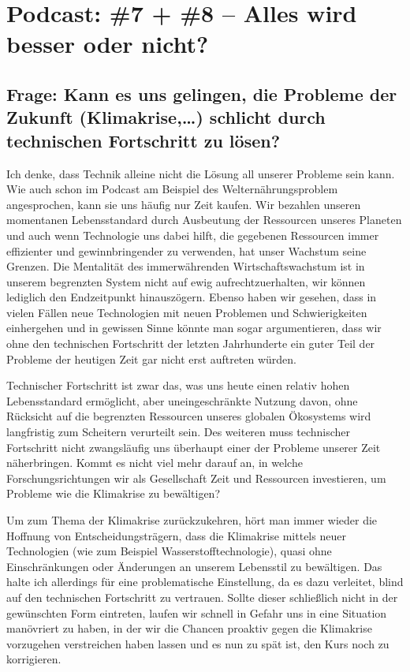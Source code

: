 \documentclass[twoside, a4paper, DIV=11, open=any, bibliography=totoc]{scrbook}
\begin{document}
\section{Podcast: \#7 + \#8 -- Alles wird besser oder nicht?}

\subsection{Frage: Kann es uns gelingen, die Probleme der Zukunft (Klimakrise,\dots)
schlicht durch technischen Fortschritt zu lösen?}

Ich denke, dass Technik alleine nicht die Lösung all unserer Probleme sein kann.
Wie auch schon im Podcast am Beispiel des Welternährungsproblem angesprochen,
kann sie uns häufig nur Zeit kaufen. Wir bezahlen unseren momentanen Lebensstandard
durch Ausbeutung der Ressourcen unseres Planeten und auch wenn Technologie uns dabei
hilft, die gegebenen Ressourcen immer effizienter und gewinnbringender zu verwenden,
hat unser Wachstum seine Grenzen.
Die Mentalität des immerwährenden Wirtschaftswachstum
ist in unserem begrenzten System nicht auf ewig aufrechtzuerhalten, wir können
lediglich den Endzeitpunkt hinauszögern. Ebenso haben wir gesehen, dass in vielen Fällen
neue Technologien mit neuen Problemen und Schwierigkeiten einhergehen und in gewissen
Sinne könnte man sogar argumentieren, dass wir ohne den technischen Fortschritt
der letzten Jahrhunderte ein guter Teil der Probleme der heutigen Zeit gar nicht
erst auftreten würden.


Technischer Fortschritt ist zwar das, was uns heute einen relativ hohen Lebensstandard ermöglicht,
aber uneingeschränkte Nutzung davon, ohne Rücksicht auf die begrenzten Ressourcen
unseres globalen Ökosystems wird langfristig zum Scheitern verurteilt sein.
Des weiteren muss technischer Fortschritt nicht zwangsläufig uns überhaupt einer
 der Probleme unserer Zeit näherbringen. Kommt es nicht viel mehr
darauf an, in welche Forschungsrichtungen wir als Gesellschaft Zeit und Ressourcen
investieren, um Probleme wie die Klimakrise zu bewältigen?


Um zum Thema der Klimakrise zurückzukehren, hört man immer wieder die Hoffnung
von Entscheidungsträgern, dass die Klimakrise mittels neuer Technologien
(wie zum Beispiel Wasserstofftechnologie), quasi ohne
Einschränkungen oder Änderungen an unserem Lebensstil zu bewältigen.
Das halte ich allerdings für eine problematische Einstellung, da es dazu
verleitet, blind auf den technischen Fortschritt zu vertrauen.
Sollte dieser schließlich nicht in der gewünschten Form eintreten, laufen wir schnell
in Gefahr uns in eine Situation manövriert zu haben, in der wir die Chancen proaktiv
gegen die Klimakrise vorzugehen verstreichen haben lassen und es nun zu spät ist,
den Kurs noch zu korrigieren.
\end{document}
